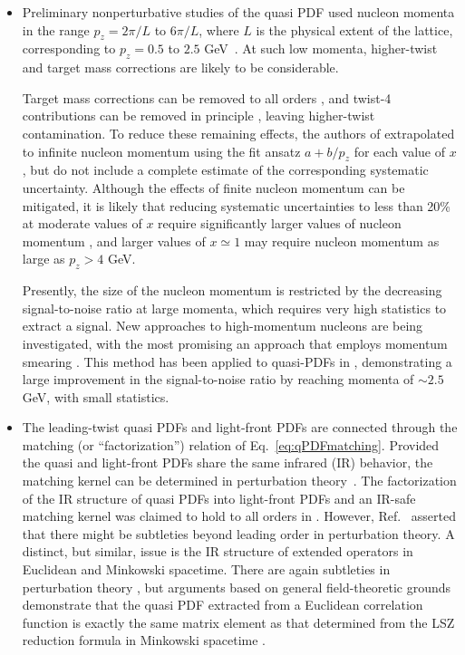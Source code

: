 \begin{itemize}
 \item Preliminary nonperturbative studies of the quasi PDF used nucleon momenta in the range $p_z = 2\pi/L$ to $6\pi/L$, where $L$ is the physical extent of the lattice, corresponding to $p_z = 0.5$ to $2.5$ GeV~\cite{Lin:2014zya,Alexandrou:2015rja,Chen:2016utp,Alexandrou:2016jqi}. At such low momenta, higher-twist and target mass corrections are likely to be considerable.

Target mass corrections can be removed to all orders \cite{Chen:2016utp}, and twist-4 contributions can be removed in principle \cite{Radyushkin:2016hsy,Chen:2016utp}, leaving higher-twist contamination. To reduce these remaining effects, the authors of \cite{Lin:2014zya,Chen:2016utp} extrapolated to infinite nucleon momentum using the fit ansatz $a + b/p_z$ for each value of $x$, but do not include a complete estimate of the corresponding systematic uncertainty. Although the effects of finite nucleon momentum can be mitigated, it is likely that reducing systematic uncertainties to less than 20\% at moderate values of $x$ require significantly larger values of nucleon momentum \cite{Gamberg:2014zwa}, and larger values of $x\simeq 1$ may require nucleon momentum as large as $p_z > 4$ GeV.

Presently, the size of the nucleon momentum is restricted by the decreasing signal-to-noise ratio at large momenta, which requires very high statistics to extract a signal. New approaches to high-momentum nucleons are being investigated, with the most promising an approach that employs momentum smearing \cite{Bali:2016lva}. This method has been applied to quasi-PDFs in \cite{Alexandrou:2016jqi}, demonstrating a large improvement in the signal-to-noise ratio by reaching momenta of $\sim 2.5$ GeV, with small statistics.

\item The leading-twist quasi PDFs and light-front PDFs are connected through the matching (or ``factorization'') relation of Eq.~\eqref{eq:qPDFmatching}. Provided the quasi and light-front PDFs share the same infrared (IR) behavior, the matching kernel can be determined in perturbation theory~\cite{Xiong:2013bka}. The factorization of the IR structure of quasi PDFs into light-front PDFs and an IR-safe matching kernel was claimed to hold to all orders in \cite{Ma:2014jla, Ma:2014jga}. However, Ref.~\cite{Li:2016amo} asserted that there might be subtleties beyond leading order in perturbation theory. A distinct, but similar, issue is the IR structure of extended operators in Euclidean and Minkowski spacetime. There are again subtleties in perturbation theory \cite{Carlson:2017gpk}, but arguments based on general field-theoretic grounds demonstrate that the quasi PDF extracted from a Euclidean correlation function is exactly the same matrix element as that determined from the LSZ reduction formula in Minkowski spacetime \cite{Briceno:2017cpo}.


\end{itemize}
